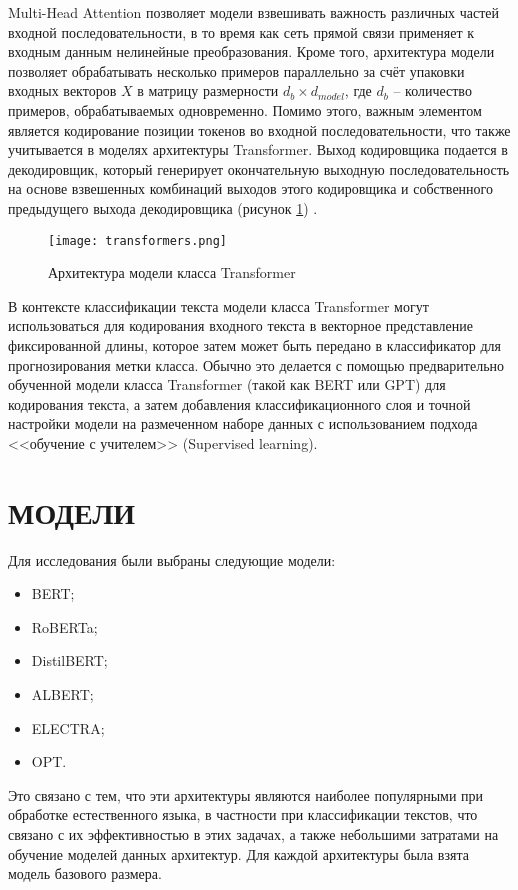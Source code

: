 Multi-Head Attention позволяет модели взвешивать важность различных частей входной последовательности, в то время как сеть прямой связи применяет к входным данным нелинейные преобразования. Кроме того, архитектура модели позволяет обрабатывать несколько примеров параллельно за счёт упаковки входных векторов $X$ в матрицу размерности $d_b \times d_{model}$, где $d_b$ -- количество примеров, обрабатываемых одновременно. Помимо этого, важным элементом является кодирование позиции токенов во входной последовательности, что также учитывается в моделях архитектуры Transformer. Выход кодировщика подается в декодировщик, который генерирует окончательную выходную последовательность на основе взвешенных комбинаций выходов этого кодировщика и собственного предыдущего выхода декодировщика (рисунок \ref{transformer:image}) \cite{transformers}.
\begin{figure}[H]
    \begin{center}
        \texttt{[image: transformers.png]}
        \caption{Архитектура модели класса Transformer}
        \label{transformer:image}
     \end{center}
\end{figure}

В контексте классификации текста модели класса Transformer могут использоваться для кодирования входного текста в векторное представление 
фиксированной длины, которое затем может быть передано в классификатор для прогнозирования метки класса. Обычно это делается с помощью 
предварительно обученной модели класса Transformer (такой как BERT или GPT) для кодирования текста, а затем добавления 
классификационного слоя и точной настройки модели на размеченном наборе данных с использованием подхода 
<<обучение с учителем>> (Supervised learning). 

\section{МОДЕЛИ}
Для исследования были выбраны следующие модели:
\begin{itemize}
    \item BERT;
    \item RoBERTa;
    \item DistilBERT;
    \item ALBERT;
    \item ELECTRA;
    \item OPT.
\end{itemize}

Это связано с тем, что эти архитектуры являются наиболее популярными при обработке естественного языка, в частности при классификации текстов, что связано с их эффективностью в этих задачах, а также небольшими затратами на обучение моделей данных архитектур. Для каждой архитектуры была взята модель базового размера. 
